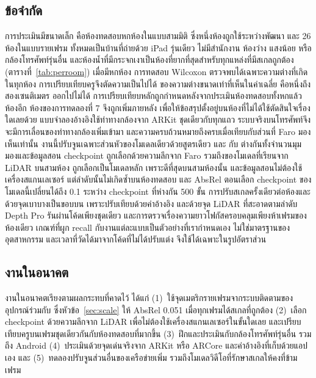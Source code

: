 \subsection{ข้อจำกัด}\label{sec:limitations}
การประเมินมีขนาดเล็ก คือห้องทดสอบหกห้องในแบบสามมิติ ซึ่งหนึ่งห้องถูกใช้ระหว่างพัฒนา และ 26 ห้องในแบบรายเฟรม
ทั้งหมดเป็นบ้านที่ถ่ายด้วย iPad รุ่นเดียว ไม่มีสำนักงาน ห้องว่าง แสงน้อย หรือกล้องโทรศัพท์รุ่นอื่น
และห้องน้ำที่มีกระจกเงาเป็นห้องที่ยากที่สุดสำหรับทุกแหล่งที่มีสเกลถูกต้อง (ตารางที่~\ref{tab:perroom})
เมื่อมีหกห้อง การทดสอบ Wilcoxon ตรวจพบได้เฉพาะความต่างที่เกิดในทุกห้อง การเปรียบเทียบครูจึงตัดความเป็นไปได้
ของความต่างขนาดเท่าที่เห็นในค่าเฉลี่ย คือหนึ่งถึงสองเซนติเมตร ออกไปไม่ได้
การเปรียบเทียบหลักถูกกำหนดหลังจากประเมินห้องทดสอบทั้งหกแล้ว ห้องอีก \rsVN{} ห้องของการทดลองที่ 7
จึงถูกเพิ่มภายหลัง เพื่อให้ข้อสรุปตั้งอยู่บนห้องที่ไม่ได้ใช้ตัดสินใจเรื่องใดเลยด้วย
แบบจำลองอ้างอิงใช้ท่าทางกล้องจาก ARKit ชุดเดียวกับทุกแถว ระบบจริงบนโทรศัพท์จึงจะมีการเลื่อนของท่าทางกล้องเพิ่มเข้ามา
และความครบถ้วนหมายถึงครบเมื่อเทียบกับส่วนที่ Faro มองเห็นเท่านั้น
งานนี้ปรับจูนเฉพาะส่วนหัวของโมเดลเดียวด้วยสูตรเดียว และ \ftfaro{} กับ \ftlidar{} ต่างกันทั้งจำนวนมุมมองและข้อมูลสอน
checkpoint ถูกเลือกด้วยความลึกจาก Faro รวมถึงของโมเดลที่เรียนจาก LiDAR บนสามห้อง \ftmain{} ถูกเลือกเป็นโมเดลหลัก
เพราะดีที่สุดบนสามห้องนั้น และข้อมูลสอนไม่ต้องใช้เครื่องสแกนเลเซอร์ แต่ลำดับนั้นไม่เกิดซ้ำบนห้องทดสอบ
และ AbsRel ตอนเลือก checkpoint ของโมเดลนี้เปลี่ยนได้ถึง 0.1 ระหว่าง checkpoint ที่ห่างกัน 500 ขั้น
การปรับสเกลครั้งเดียวต่อห้องและด้วยจุดเบาบางเป็นขอบบน เพราะปรับเทียบด้วยค่าอ้างอิง และด้วยจุด LiDAR ที่สะอาดตามลำดับ
Depth Pro รันผ่านโค้ดเพียงชุดเดียว และการตรวจเรื่องความยาวโฟกัสครอบคลุมเพียงห้าเฟรมของห้องเดียว
เกณฑ์ที่ผูก recall กับงานแต่ละแบบเป็นตัวอย่างที่เรากำหนดเอง ไม่ใช่มาตรฐานของอุตสาหกรรม
และเวลาที่วัดได้มาจากโค้ดที่ไม่ได้ปรับแต่ง จึงใช้ได้เฉพาะในรูปอัตราส่วน

\subsection{งานในอนาคต}\label{sec:future}
งานในอนาคตเรียงตามผลกระทบที่คาดไว้ ได้แก่ (1)~ใช้จุดเมตริกรายเฟรมจากระบบติดตามของอุปกรณ์ร่วมกับ \ftmain{}
ซึ่งหัวข้อ~\ref{sec:scale} ให้ AbsRel 0.051 เมื่อทุกเฟรมได้สเกลที่ถูกต้อง
(2)~เลือก checkpoint ด้วยความลึกจาก LiDAR เพื่อไม่ต้องใช้เครื่องสแกนเลเซอร์ในขั้นใดเลย
และเปรียบเทียบครูบนเฟรมชุดเดียวกันกับห้องทดสอบที่มากขึ้น (3)~ฝึกและประเมินกับกล้องโทรศัพท์รุ่นอื่น รวมถึง Android
(4)~ประเมินด้วยจุดเด่นจริงจาก ARKit หรือ ARCore และค่าอ้างอิงที่เก็บด้วยแอปเอง
และ (5)~ทดลองปรับจูนส่วนอื่นของเครือข่ายเพิ่ม รวมถึงโมเดลวิดีโอที่รักษาสเกลให้คงที่ข้ามเฟรม~\cite{videoda}

